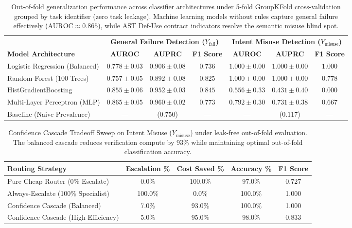 \begin{table}[t]
\centering
\small
\caption{Out-of-fold generalization performance across classifier architectures under 5-fold GroupKFold cross-validation grouped by task identifier (zero task leakage). Machine learning models without rules capture general failure effectively ($\text{AUROC} \approx 0.865$), while AST Def-Use contract indicators resolve the semantic misuse blind spot.}
\label{tab:out_of_fold_benchmark}
\begin{tabular}{l|ccc|ccc}
\hline
& \multicolumn{3}{c|}{\textbf{General Failure Detection ($Y_{\text{fail}}$)}} & \multicolumn{3}{c}{\textbf{Intent Misuse Detection ($Y_{\text{misuse}}$)}} \\
\textbf{Model Architecture} & \textbf{AUROC} & \textbf{AUPRC} & \textbf{F1 Score} & \textbf{AUROC} & \textbf{AUPRC} & \textbf{F1 Score} \\
\hline
Logistic Regression (Balanced)   & $0.778 \pm 0.03$ & $0.906 \pm 0.08$ & $0.736$ & $\mathbf{1.000 \pm 0.00}$ & $\mathbf{1.000 \pm 0.00}$ & $\mathbf{1.000}$ \\
Random Forest (100 Trees)        & $0.757 \pm 0.05$ & $0.892 \pm 0.08$ & $0.825$ & $\mathbf{1.000 \pm 0.00}$ & $\mathbf{1.000 \pm 0.00}$ & $0.778$ \\
HistGradientBoosting             & $0.855 \pm 0.06$ & $0.952 \pm 0.03$ & $\mathbf{0.845}$ & $0.556 \pm 0.33$ & $0.431 \pm 0.40$ & $0.000$ \\
Multi-Layer Perceptron (MLP)     & $\mathbf{0.865 \pm 0.05}$ & $\mathbf{0.960 \pm 0.02}$ & $0.773$ & $0.792 \pm 0.30$ & $0.731 \pm 0.38$ & $0.667$ \\
\hline
Baseline (Naive Prevalence)      & — & ($0.750$) & — & — & ($0.117$) & — \\
\hline
\end{tabular}
\end{table}

\begin{table}[t]
\centering
\small
\caption{Confidence Cascade Tradeoff Sweep on Intent Misuse ($Y_{\text{misuse}}$) under leak-free out-of-fold evaluation. The balanced cascade reduces verification compute by 93\% while maintaining optimal out-of-fold classification accuracy.}
\label{tab:cascade_sweep}
\begin{tabular}{l|cccc}
\hline
\textbf{Routing Strategy} & \textbf{Escalation \%} & \textbf{Cost Saved \%} & \textbf{Accuracy \%} & \textbf{F1 Score} \\
\hline
Pure Cheap Router (0\% Escalate)     & 0.0\%   & 100.0\% & 97.0\%  & 0.727 \\
Always-Escalate (100\% Specialist)   & 100.0\% & 0.0\%   & 100.0\% & 1.000 \\
Confidence Cascade (Balanced)        & 7.0\%   & 93.0\%  & 100.0\% & 1.000 \\
Confidence Cascade (High-Efficiency) & 5.0\%   & 95.0\%  & 98.0\%  & 0.833 \\
\hline
\end{tabular}
\end{table}

